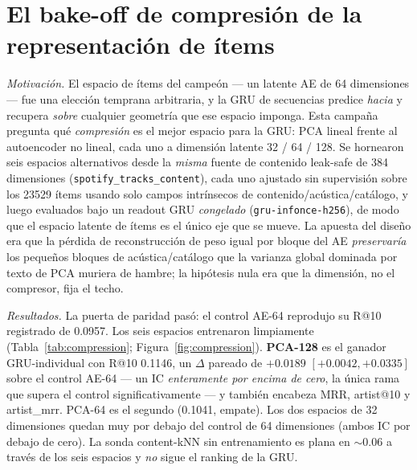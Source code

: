 \documentclass[11pt]{article}
\newcommand{\dsid}[1]{\texttt{\small #1}}
\begin{document}
\section{El bake-off de compresión de la representación de ítems}
\label{sec:compression}
\emph{Motivación.} El espacio de ítems del campeón --- un latente AE de 64
dimensiones --- fue una elección temprana arbitraria, y la GRU de secuencias
predice \emph{hacia} y recupera \emph{sobre} cualquier geometría que ese espacio
imponga. Esta campaña pregunta qué \emph{compresión} es el mejor espacio para la
GRU: PCA lineal frente al autoencoder no lineal, cada uno a dimensión latente
32 / 64 / 128. Se hornearon seis espacios alternativos desde la \emph{misma}
fuente de contenido leak-safe de 384 dimensiones (\dsid{spotify\_tracks\_content}),
cada uno ajustado sin supervisión sobre los \num{23529} ítems usando solo campos
intrínsecos de contenido/acústica/catálogo, y luego evaluados bajo un readout
GRU \emph{congelado} (\texttt{gru-infonce-h256}), de modo que el espacio latente
de ítems es el único eje que se mueve. La apuesta del diseño era que la pérdida
de reconstrucción de peso igual por bloque del AE \emph{preservaría} los
pequeños bloques de acústica/catálogo que la varianza global dominada por texto
de PCA muriera de hambre; la hipótesis nula era que la dimensión, no el
compresor, fija el techo.

\emph{Resultados.} La puerta de paridad pasó: el control AE-64 reprodujo su R@10
registrado de \num{0.0957}. Los seis espacios entrenaron limpiamente
(Tabla~\ref{tab:compression}; Figura~\ref{fig:compression}). \textbf{PCA-128} es
el ganador GRU-individual con R@10 \num{0.1146}, un $\Delta$ pareado de
$+\num{0.0189}$ $[+0.0042, +0.0335]$ sobre el control AE-64 --- un IC
\emph{enteramente por encima de cero}, la única rama que supera el control
significativamente --- y también encabeza MRR, artist@10 y artist\_mrr. PCA-64
es el segundo (\num{0.1041}, empate). Los dos espacios de 32 dimensiones quedan
muy por debajo del control de 64 dimensiones (ambos IC por debajo de cero). La
sonda content-kNN sin entrenamiento es plana en $\sim$0.06 a través de los seis
espacios y \emph{no} sigue el ranking de la GRU.
\end{document}
